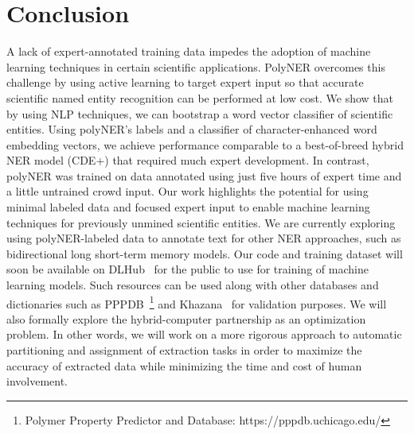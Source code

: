 \section{Conclusion}
\label{sect:apner_conclusion}
A lack of expert-annotated training data impedes the adoption of machine learning techniques in certain scientific applications.
PolyNER overcomes this challenge by 
using active learning to target 
expert input so that accurate scientific named entity recognition can be performed at low cost.
We show that by using NLP techniques, we can bootstrap a word vector classifier of scientific entities.
Using polyNER's labels and a classifier of character-enhanced word embedding vectors, we achieve 
performance comparable to a best-of-breed
hybrid NER model (CDE+) that required much expert development.
In contrast, polyNER was trained on data annotated using just five hours of expert time and a little untrained crowd input.
Our work highlights the potential for using minimal labeled data %
and focused expert input to enable machine learning techniques for previously unmined scientific entities. 
We are currently exploring using polyNER-labeled data to annotate text for other NER approaches,
such as bidirectional long short-term memory models. 
Our code and training dataset will soon be available on DLHub~\cite{chard2018dlhub} for the public to use for training of machine learning models.
Such resources can be used along with other databases and dictionaries such as PPPDB~\footnote{Polymer Property Predictor and Database: https://pppdb.uchicago.edu/} and Khazana~\cite{huan2016polymer} for validation purposes. 
We will also formally explore the hybrid-computer partnership as an optimization problem.
In other words, we will work on a more
rigorous approach to automatic partitioning and assignment of extraction tasks in order to maximize the accuracy of extracted data while minimizing the time and cost of human involvement.

